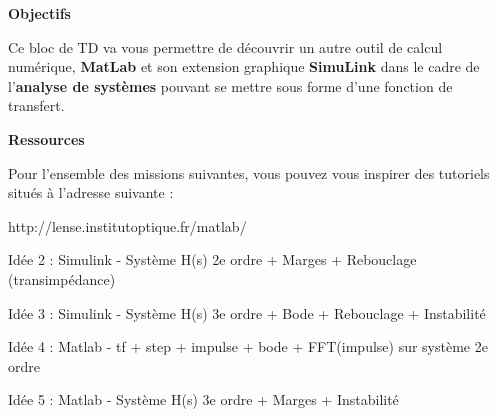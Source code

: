 \documentclass[a4paper,french]{paper}
\author{Julien VILLEMEJANE}
\subtitle{Bloc4}
\title{\titre}
\begin{document}
 
\enteteThematiqueObligatoire{}


\textbf{Objectifs}

Ce bloc de TD va vous permettre de découvrir un autre outil de calcul numérique, \textbf{MatLab} et son extension graphique \textbf{SimuLink} dans le cadre de l'\textbf{analyse de systèmes} pouvant se mettre sous forme d'une fonction de transfert.

\textbf{Ressources}

Pour l'ensemble des missions suivantes, vous pouvez vous inspirer des tutoriels situés à l'adresse suivante :

http://lense.institutoptique.fr/matlab/ 

\bigskip



Idée 2 : Simulink - Système H(s) 2e ordre + Marges + Rebouclage (transimpédance)

Idée 3 : Simulink - Système H(s) 3e ordre + Bode + Rebouclage + Instabilité

Idée 4 : Matlab - tf + step + impulse + bode + FFT(impulse) sur système 2e ordre 

Idée 5 : Matlab - Système H(s) 3e ordre + Marges + Instabilité


%
\end{document}
